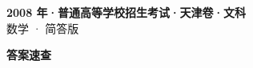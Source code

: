 \documentclass[zihao=-4, a4paper]{ctexart}
\begin{document}
\begin{center}
  {\Large\bfseries 2008 年·普通高等学校招生考试·天津卷·文科}\\[4pt]
  {\large 数学 · 简答版}
\end{center}
\medskip
{}

\clearpage
{}
\begin{center}{\Large\bfseries 答案速查}\end{center}
\medskip

\end{document}
